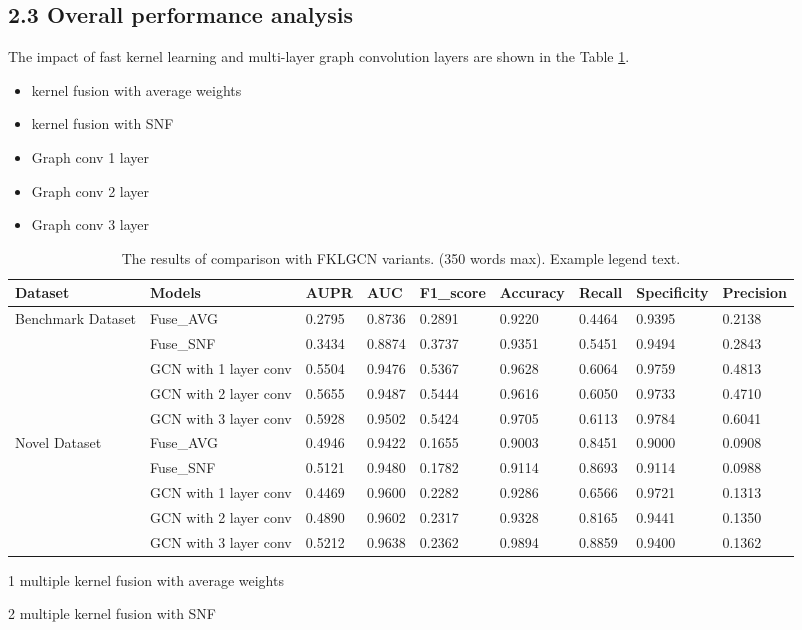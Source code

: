 \documentclass[fleqn,10pt]{wlscirep}
\begin{document}
\subsection*{2.3 Overall performance analysis}
The impact of fast kernel learning and multi-layer graph convolution layers are shown in the Table \ref{tab:parameter1}.
\begin{itemize}
\item kernel fusion with average weights
\item kernel fusion with SNF
\item Graph conv 1 layer
\item Graph conv 2 layer
\item Graph conv 3 layer
\end{itemize}
\begin{table}[ht]
\centering
 \caption{\label{tab:parameter1}The results of comparison with FKLGCN variants. (350 words max). Example legend text.}
\begin{threeparttable}[b]
\begin{tabular}{|l|l|l|l|l|l|l|l|l|}
\hline
Dataset & Models & AUPR & AUC &	F1_score & Accuracy	& Recall & Specificity & Precision\\
\hline
\multirow{4}{5em}{Benchmark Dataset} 
& Fuse_AVG\tnote{1} & 0.2795 & 0.8736 & 0.2891 & 0.9220 & 0.4464 & 0.9395 & 0.2138\\
& Fuse_SNF\tnote{2} & 0.3434	& 0.8874 & 0.3737	& 0.9351 & 0.5451	& 0.9494 & 0.2843\\
& GCN with 1 layer conv & 0.5504 & 0.9476 & 0.5367 & 0.9628 & 0.6064 & 0.9759 & 0.4813\\ 
& GCN with 2 layer conv & 0.5655 & 0.9487 & 0.5444 & 0.9616 & 0.6050 & 0.9733 & 0.4710\\
& GCN with 3 layer conv& 0.5928 & 0.9502 & 0.5424 & 0.9705 & 0.6113 & 0.9784 & 0.6041\\
\hline
\multirow{4}{6em}{Novel Dataset} 
& Fuse_AVG\tnote{1} & 0.4946 & 0.9422 & 0.1655 & 0.9003 & 0.8451 & 0.9000 & 0.0908\\
& Fuse_SNF\tnote{2} & 0.5121 & 0.9480 & 0.1782 & 0.9114 & 0.8693 & 0.9114	& 0.0988\\
& GCN with 1 layer conv & 0.4469 & 0.9600 & 0.2282 & 0.9286 & 0.6566 & 0.9721 & 0.1313\\ 
& GCN with 2 layer conv & 0.4890 & 0.9602 & 0.2317 & 0.9328 & 0.8165 & 0.9441 & 0.1350\\
& GCN with 3 layer conv & 0.5212 & 0.9638 & 0.2362 & 0.9894 & 0.8859 & 0.9400 & 0.1362\\
\hline
\end{tabular}
\begin{tablenotes}
     \item[1] multiple kernel fusion with average weights
     \item[2] multiple kernel fusion with SNF
     \end{tablenotes}
     \end{threeparttable}
\end{table}
\end{document}
